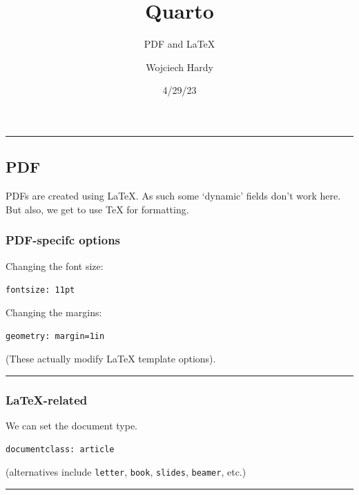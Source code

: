 \documentclass[
  11pt,
]{article}
\title{Quarto}
\subtitle{PDF and LaTeX}
\author{Wojciech Hardy}
\date{4/29/23}
\begin{document}
\maketitle
\ifdefined\Shaded\renewenvironment{Shaded}{\begin{tcolorbox}[interior hidden, frame hidden, sharp corners, boxrule=0pt, breakable, enhanced, borderline west={3pt}{0pt}{shadecolor}]}{\end{tcolorbox}}\fi

\begin{center}\rule{0.5\linewidth}{0.5pt}\end{center}

\hypertarget{pdf}{%
\subsection{PDF}\label{pdf}}

PDFs are created using LaTeX. As such some `dynamic' fields don't work
here. But also, we get to use TeX for formatting.

\hypertarget{pdf-specifc-options}{%
\subsubsection{PDF-specifc options}\label{pdf-specifc-options}}

Changing the font size:

\texttt{fontsize:\ 11pt}

Changing the margins:

\texttt{geometry:\ margin=1in}

(These actually modify LaTeX template options).

\begin{center}\rule{0.5\linewidth}{0.5pt}\end{center}

\hypertarget{latex-related}{%
\subsubsection{LaTeX-related}\label{latex-related}}

We can set the document type.

\texttt{documentclass:\ article}

(alternatives include \texttt{letter}, \texttt{book}, \texttt{slides},
\texttt{beamer}, etc.)

\begin{center}\rule{0.5\linewidth}{0.5pt}\end{center}
\end{document}
